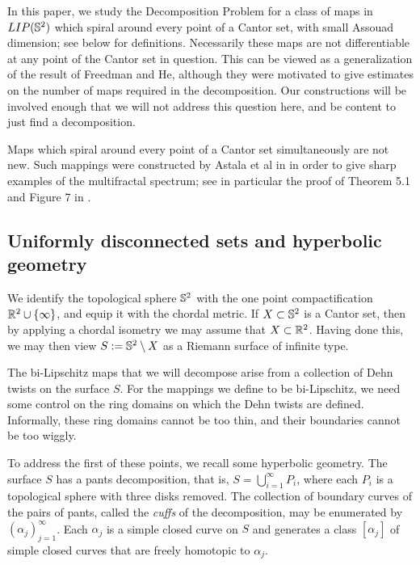 \documentclass{amsart}
\begin{document}
In this paper, we study the Decomposition Problem for a class of maps in $LIP(\S^2)$ which spiral around every point of a Cantor set, with small Assouad dimension; see below for definitions. Necessarily these maps are not differentiable at any point of the Cantor set in question. This can be viewed as a generalization of the result of Freedman and He, although they were motivated to give estimates on the number of maps required in the decomposition. Our constructions will be involved enough that we will not address this question here, and be content to just find a decomposition.

Maps which spiral around every point of a Cantor set simultaneously are not new. Such mappings  were constructed by Astala et al in \cite{AIPS} in order to give sharp examples of the multifractal spectrum; see in particular the proof of Theorem 5.1 and Figure 7 in \cite{AIPS}.




\subsection{Uniformly disconnected sets and hyperbolic geometry}

We identify the topological sphere $\S^2$ with the one point compactification $\R^2 \cup \{ \infty \}$, and equip it with the chordal metric. If $X \subset \S^2$ is a Cantor set, then by applying a chordal isometry we may assume that $X\subset \R^2$. Having done this, we may then view $S:= \S^2 \setminus X$ as a Riemann surface of infinite type. 

The bi-Lipschitz maps that we will decompose arise from a collection of Dehn twists on the surface $S$. For the mappings we define to be bi-Lipschitz, we need some control on the ring domains on which the Dehn twists are defined. Informally, these ring domains cannot be too thin, and their boundaries cannot be too wiggly.

To address the first of these points, we recall some hyperbolic geometry. The surface $S$ has a pants decomposition, that is, $S = \bigcup_{i=1}^{\infty} P_i$, where each $P_i$ is a topological sphere with three disks removed. 
The collection of boundary curves of the pairs of pants, called the \emph{cuffs} of the decomposition, may be enumerated by $(\alpha_j)_{j=1}^{\infty}$. 
Each $\alpha_j$ is a simple closed curve on $S$ and generates a class $[\alpha_j]$ of simple closed curves that are freely homotopic to $\alpha_j$.
\end{document}
